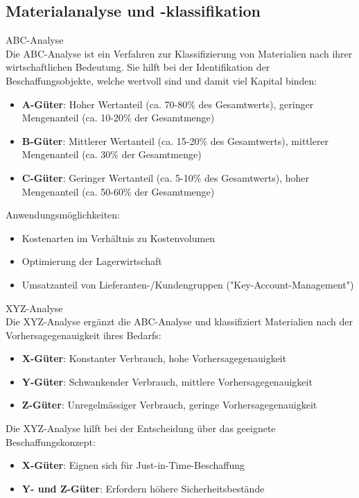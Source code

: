 \subsection{Materialanalyse und -klassifikation}

\begin{definition}{ABC-Analyse}\\
Die ABC-Analyse ist ein Verfahren zur Klassifizierung von Materialien nach ihrer wirtschaftlichen Bedeutung. Sie hilft bei der Identifikation der Beschaffungsobjekte, welche wertvoll sind und damit viel Kapital binden:
\begin{itemize}
    \item \textbf{A-Güter}: Hoher Wertanteil (ca. 70-80\% des Gesamtwerts), geringer Mengenanteil (ca. 10-20\% der Gesamtmenge)
    \item \textbf{B-Güter}: Mittlerer Wertanteil (ca. 15-20\% des Gesamtwerts), mittlerer Mengenanteil (ca. 30\% der Gesamtmenge)
    \item \textbf{C-Güter}: Geringer Wertanteil (ca. 5-10\% des Gesamtwerts), hoher Mengenanteil (ca. 50-60\% der Gesamtmenge)
\end{itemize}

Anwendungsmöglichkeiten:
\begin{itemize}
    \item Kostenarten im Verhältnis zu Kostenvolumen
    \item Optimierung der Lagerwirtschaft
    \item Umsatzanteil von Lieferanten-/Kundengruppen ("Key-Account-Management")
\end{itemize}
\end{definition}

\begin{definition}{XYZ-Analyse}\\
Die XYZ-Analyse ergänzt die ABC-Analyse und klassifiziert Materialien nach der Vorhersagegenauigkeit ihres Bedarfs:
\begin{itemize}
    \item \textbf{X-Güter}: Konstanter Verbrauch, hohe Vorhersagegenauigkeit
    \item \textbf{Y-Güter}: Schwankender Verbrauch, mittlere Vorhersagegenauigkeit
    \item \textbf{Z-Güter}: Unregelmässiger Verbrauch, geringe Vorhersagegenauigkeit
\end{itemize}

Die XYZ-Analyse hilft bei der Entscheidung über das geeignete Beschaffungskonzept:
\begin{itemize}
    \item \textbf{X-Güter}: Eignen sich für Just-in-Time-Beschaffung
    \item \textbf{Y- und Z-Güter}: Erfordern höhere Sicherheitsbestände
\end{itemize}
\end{definition}

